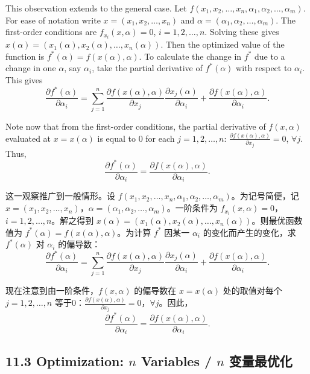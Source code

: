 \begin{original}
This observation extends to the general case. Let $f(x_1, x_2, \ldots, x_n, \alpha_1, \alpha_2, \ldots, \alpha_m)$. For ease of notation write $x = (x_1, x_2, \ldots, x_n)$ and $\alpha = (\alpha_1, \alpha_2, \ldots, \alpha_m)$. The first-order conditions are $f_{x_i}(x,\alpha) = 0$, $i = 1,2,\ldots,n$. Solving these gives $x(\alpha) = (x_1(\alpha), x_2(\alpha), \ldots, x_n(\alpha))$. Then the optimized value of the function is $f^*(\alpha) = f(x(\alpha),\alpha)$. To calculate the change in $f^*$ due to a change in one $\alpha$, say $\alpha_i$, take the partial derivative of $f^*(\alpha)$ with respect to $\alpha_i$. This gives
\[
\frac{\partial f^*(\alpha)}{\partial \alpha_i} = \sum_{j=1}^n \frac{\partial f(x(\alpha),\alpha)}{\partial x_j} \frac{\partial x_j(\alpha)}{\partial \alpha_i} + \frac{\partial f(x(\alpha),\alpha)}{\partial \alpha_i}.
\]

Note now that from the first-order conditions, the partial derivative of $f(x,\alpha)$ evaluated at $x = x(\alpha)$ is equal to 0 for each $j = 1,2,\ldots,n$: $\frac{\partial f(x(\alpha),\alpha)}{\partial x_j} = 0$, $\forall j$. Thus,
\[
\frac{\partial f^*(\alpha)}{\partial \alpha_i} = \frac{\partial f(x(\alpha),\alpha)}{\partial \alpha_i}.
\]
\end{original}
\begin{translation}
这一观察推广到一般情形。设 $f(x_1, x_2, \ldots, x_n, \alpha_1, \alpha_2, \ldots, \alpha_m)$。为记号简便，记 $x = (x_1, x_2, \ldots, x_n)$，$\alpha = (\alpha_1, \alpha_2, \ldots, \alpha_m)$。一阶条件为 $f_{x_i}(x,\alpha) = 0$，$i = 1,2,\ldots,n$。解之得到 $x(\alpha) = (x_1(\alpha), x_2(\alpha), \ldots, x_n(\alpha))$。则最优函数值为 $f^*(\alpha) = f(x(\alpha),\alpha)$。为计算 $f^*$ 因某一 $\alpha_i$ 的变化而产生的变化，求 $f^*(\alpha)$ 对 $\alpha_i$ 的偏导数：
\[
\frac{\partial f^*(\alpha)}{\partial \alpha_i} = \sum_{j=1}^n \frac{\partial f(x(\alpha),\alpha)}{\partial x_j} \frac{\partial x_j(\alpha)}{\partial \alpha_i} + \frac{\partial f(x(\alpha),\alpha)}{\partial \alpha_i}.
\]

现在注意到由一阶条件，$f(x,\alpha)$ 的偏导数在 $x = x(\alpha)$ 处的取值对每个 $j = 1,2,\ldots,n$ 等于0：$\frac{\partial f(x(\alpha),\alpha)}{\partial x_j} = 0$，$\forall j$。因此，
\[
\frac{\partial f^*(\alpha)}{\partial \alpha_i} = \frac{\partial f(x(\alpha),\alpha)}{\partial \alpha_i}.
\]
\end{translation}

\subsection{11.3 Optimization: $n$ Variables / $n$ 变量最优化}

